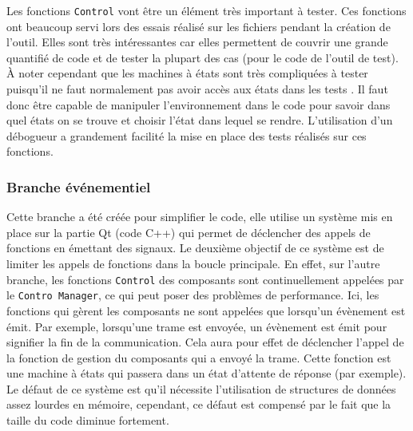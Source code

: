 \documentclass[a4paper]{article}
\begin{document}
Les fonctions \verb|Control| vont être un élément très important à tester. Ces
fonctions ont beaucoup servi lors des essais réalisé sur les fichiers pendant la
création de l'outil. Elles sont très intéressantes car elles permettent de
couvrir une grande quantifié de code et de tester la plupart des cas (pour le
code de l'outil de test). À noter cependant que les machines à états sont très
compliquées à tester puisqu'il ne faut normalement pas avoir accès aux états
dans les tests \cite{teststatemachines}. Il faut donc être capable de manipuler
l'environnement dans le code pour savoir dans quel états on se trouve et choisir
l'état dans lequel se rendre. L'utilisation d'un débogueur a grandement facilité
la mise en place des tests réalisés sur ces fonctions.

\subsubsection{Branche événementiel}
\label{brancheevent}

Cette branche a été créée pour simplifier le code, elle utilise un système mis
en place sur la partie Qt (code C++) qui  permet de déclencher des appels de
fonctions en émettant des signaux. Le deuxième objectif de ce système est de
limiter les appels de fonctions dans la boucle principale. En effet, sur l'autre
branche, les fonctions \verb|Control| des composants sont continuellement
appelées par le \verb|Contro Manager|, ce qui peut poser des problèmes de
performance. Ici, les fonctions qui gèrent les composants ne sont appelées que
lorsqu'un évènement est émit. Par exemple, lorsqu'une trame est envoyée, un
évènement est émit pour signifier la fin de la communication. Cela aura pour
effet de déclencher l'appel de la fonction de gestion du composants qui a envoyé
la trame. Cette fonction est une machine à états qui passera dans un état
d'attente de réponse (par exemple). Le défaut de ce système est qu'il nécessite
l'utilisation de structures de données assez lourdes en mémoire, cependant, ce
défaut est compensé par le fait que la taille du code diminue fortement.
\end{document}
